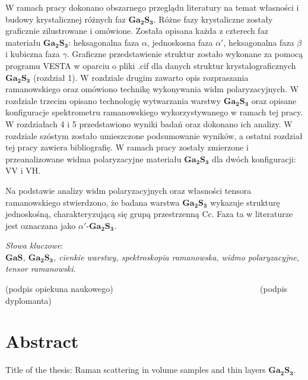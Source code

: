 W ramach pracy dokonano obszarnego przeglądu literatury na temat własności i budowy krystalicznej różnych faz $\mathbf{Ga_{2}S_{3}}$. Różne fazy krystaliczne zostały graficznie zilustrowane i omówione. Została opisana każda z czterech faz materiału $\mathbf{Ga_{2}S_{3}}$: heksagonalna faza $\alpha$, jednoskosna faza $\alpha'$, heksagonalna faza $\beta$ i kubiczna faza $\gamma$. Graficzne przedstawienie struktur zostało wykonane za pomocą programu VESTA w oparciu o pliki .cif dla danych struktur krystalograficznych $\mathbf{Ga_{2}S_{3}}$ (rozdział 1). W rozdziale drugim zawarto opis rozpraszania ramanowskiego oraz omówiono technikę wykonywania widm polaryzacyjnych. W rozdziale trzecim opisano technologię wytwarzania warstwy $\mathbf{Ga_{2}S_{3}}$ oraz opisane konfiguracje spektrometru ramanowskiego wykorzystywanego w ramach tej pracy. W rozdziałach 4 i 5 przedstawiono wyniki badań oraz dokonano ich analizy. W rozdziale szóstym zostało umieszczone podsumowanie wyników, a ostatni rozdział tej pracy zawiera bibliografię. W ramach pracy zostały zmierzone i przeanalizowane widma polaryzacyjne materiału $\mathbf{Ga_{2}S_{3}}$ dla dwóch konfiguracji: VV i VH.

Na podstawie analizy widm polaryzacyjnych oraz własności tensora ramanowskiego stwierdzono, że badana warstwa $\mathbf{Ga_{2}S_{3}}$ wykazuje strukturę jednoskośną, charakteryzującą się grupą przestrzenną Cc. Faza ta w literaturze jest oznaczana jako $\alpha'$-$\mathbf{Ga_{2}S_{3}}$.

\vspace{10mm}

\textit{Słowa kluczowe}: \\
\textit{$\mathbf{GaS}$, $\mathbf{Ga_{2}S_{3}}$, cienkie warstwy, spektroskopia ramanowska, widmo polaryzacyjne, tensor ramanowski}.

\vspace{30mm}

(podpis opiekuna naukowego) \textcolor{white}{---------------------------------------------------} (podpis dyplomanta)

\newpage

\section*{Abstract}

Title of the thesis: Raman scattering in volume samples and thin layers $\mathbf{Ga_{2}S_{3}}$.

\vspace{10mm}

